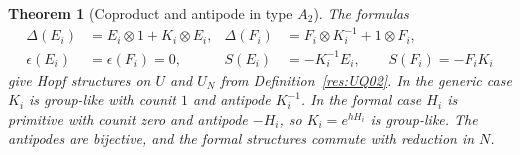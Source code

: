 \documentclass[11pt,oneside,openany]{book}
\newtheorem{theorem}{Theorem}[chapter]
\theoremstyle{definition}
\theoremstyle{remark}
\begin{document}
\begin{theorem}[Coproduct and antipode in type \(A_2\)]
\label{res:UQ06}
The formulas
\[
\begin{aligned}
 \Delta(E_i)&=E_i\otimes1+K_i\otimes E_i, &
 \Delta(F_i)&=F_i\otimes K_i^{-1}+1\otimes F_i,\\
 \epsilon(E_i)&=\epsilon(F_i)=0, &
 S(E_i)&=-K_i^{-1}E_i,\qquad S(F_i)=-F_iK_i
\end{aligned}
\]
give Hopf structures on \(U\) and \(U_N\) from
Definition~\ref{res:UQ02}. In the generic case \(K_i\)
is group-like with counit \(1\) and antipode \(K_i^{-1}\).
In the formal case \(H_i\) is primitive with counit
zero and antipode \(-H_i\), so \(K_i=e^{hH_i}\) is
group-like. The antipodes are bijective, and the formal
structures commute with reduction in \(N\).
\end{theorem}
\end{document}
